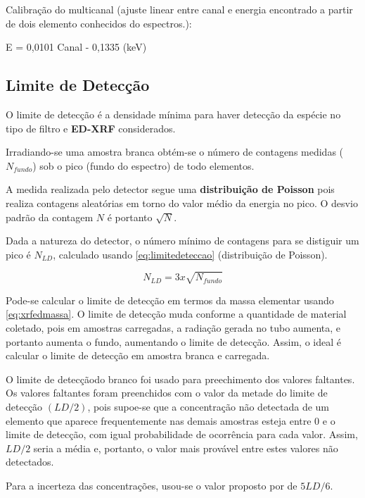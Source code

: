 Calibração do multicanal (ajuste linear entre canal e energia 
encontrado a partir de dois elemento conhecidos do espectros.): 

E = 0,0101 Canal - 0,1335 (keV)

\subsection{Limite de Detecção}

O limite de detecção é a densidade mínima para haver 
detecção da espécie no tipo de filtro e \textbf{ED-XRF} considerados. 

Irradiando-se uma amostra branca obtém-se o número de contagens 
medidas ($N_{fundo}$) sob o pico (fundo do espectro) de todo elementos.

A medida realizada pelo detector segue uma \textbf{distribuição de Poisson}
pois realiza contagens aleatórias em torno do valor médio da energia 
no pico. O desvio padrão da contagem $N$ é portanto $\sqrt{N}$.

Dada a natureza do detector, o número mínimo de contagens para se 
distiguir um pico é $N_{LD}$, calculado usando \ref{eq:limitedeteccao} 
(distribuição de Poisson).

\begin{equation}
  \label{eq:limitedeteccao}
  N_{LD} = 3 x \sqrt{N_{fundo}}
\end{equation}

Pode-se calcular o limite de detecção em termos da massa 
elementar usando \ref{eq:xrfedmassa}.
O limite de detecção muda conforme a quantidade de material coletado,
pois em amostras carregadas, a radiação gerada no tubo aumenta, e 
portanto aumenta o fundo, aumentando o limite de detecção. 
Assim, o ideal é calcular o limite de detecção
em amostra branca e carregada.

O limite de detecçãodo branco foi usado para preechimento dos valores faltantes.  
Os valores faltantes foram preenchidos com o valor da metade do 
limite de detecção $(LD/2)$, pois supoe-se que a concentração não 
detectada de um elemento que aparece frequentemente nas demais amostras 
esteja entre 0 e o limite de detecção, com igual probabilidade de ocorrência 
para cada valor. Assim, $LD/2$ seria a média e, portanto, o valor mais 
provável entre estes valores não detectados. 

Para a incerteza das concentrações, usou-se o valor proposto por
\citep{polissar1998} de $5LD/6$.
